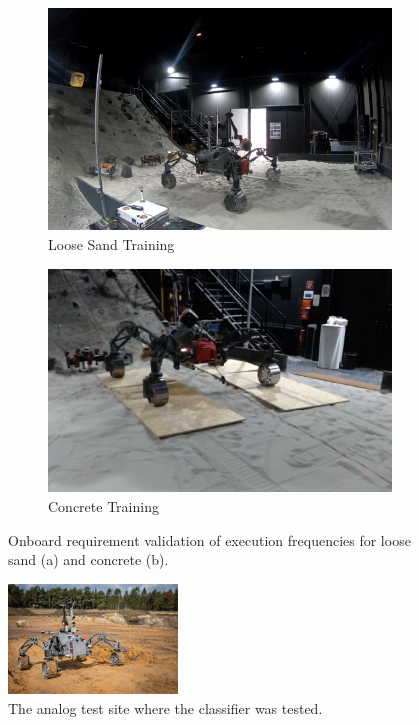\documentclass{article}
\begin{document}
\begin{figure}[!t]
    \centering
    \begin{subfigure}[t]{0.4\textwidth}
        \includegraphics[width=\textwidth]{../figures/spacehall.png}
        \caption{Loose Sand Training}
    \end{subfigure}
    \begin{subfigure}[t]{0.4\textwidth}
        \includegraphics[width=\textwidth]{../figures/spacehallconcrete.png}
        \caption{Concrete Training}
    \end{subfigure}
    \caption{Onboard requirement validation of execution frequencies for loose sand (a) and concrete (b).}
    \label{fig:sh-tests}
\end{figure}

\begin{figure}[!h]
    \centering
        \includegraphics[width=0.4\textwidth]{../figures/sandmine_v2.jpg}
    \caption{The analog test site where the classifier was tested.}
    \label{fig:finaltest}
\end{figure}
\end{document}
